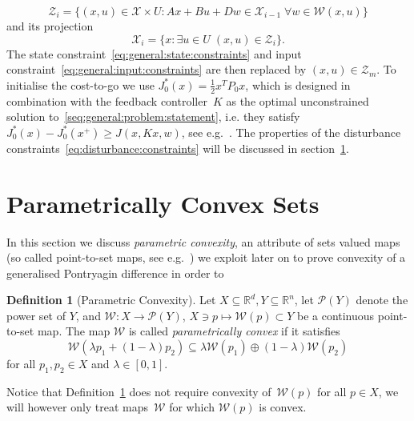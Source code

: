 \documentclass[journal]{IEEEtran}
\newcounter{thmcount}
\theoremstyle{remark}
\theoremstyle{definition}
\newtheorem{defi}[thmcount]{Definition}
\begin{document}
%
\begin{equation}\label{eq:stage:constraints:in:x:and:u}
  \mathcal Z_i = \{(x,u)\in\mathcal X\times U: Ax + Bu + Dw \in\mathcal X_{i-1}\;\forall w\in\mathcal W(x,u)\}
\end{equation}
%
and its projection
%
\begin{equation}
  \mathcal X_i = \{x:\exists u\in U\; (x,u)\in\mathcal Z_i\}.
\end{equation}
%
The state constraint~\eqref{eq:general:state:constraints} and input constraint~\eqref{eq:general:input:constraints}
are then replaced by $(x,u)\in\mathcal Z_m$.
%
To initialise the cost-to-go we use $J_0^\ast(x) = \frac{1}{2}x^T P_0x$, which is designed in combination with the feedback 
controller~$K$ as the optimal unconstrained solution to~\eqref{seq:general:problem:statement}, i.e. they satisfy
$J_0^\ast(x) - J_0^\ast(x^+)\geq J(x,Kx,w)$, see e.g.~\cite{Boyd:94}.
%
The properties of the disturbance constraints~\eqref{eq:disturbance:constraints} will be discussed
in section~\ref{sec:p:convex:sets}.
%
%
%
%
\section{Parametrically Convex Sets}\label{sec:p:convex:sets}
In this section we discuss \emph{parametric convexity}, an attribute of sets valued maps 
(so called point-to-set maps, see e.g.~\cite{Hogan:1973}) we exploit later on to prove 
convexity of a generalised Pontryagin difference in order to 
%
\begin{defi}[Parametric Convexity]\label{def:parametric:convexity}
  Let $X\subseteq\mathbb R^d, Y\subseteq\mathbb R^n$, let $\mathscr P(Y)$ 
  denote the power set of $Y$, 
  and $\mathcal W:X\rightarrow \mathscr P(Y)$, $X\ni p\mapsto \mathcal W(p)
  \subset Y$ be a continuous point-to-set map. The map $\mathcal W$ is called 
  \emph{parametrically convex} if it satisfies
%
  \begin{equation}\label{eq:def:parametrically:convex}
  \mathcal W(\lambda p_1 + (1-\lambda)p_2)\subseteq\lambda \mathcal W(p_1) \oplus (1-\lambda) \mathcal W(p_2)
  \end{equation}
%
  for all $p_1,p_2\in X$ and $\lambda\in[0,1]$.
\end{defi}
%
Notice that Definition~\ref{def:parametric:convexity} does not require convexity of~$\mathcal W(p)$ for all
$p\in X$, we will however only treat maps~$\mathcal W$ for which $\mathcal W(p)$ is convex.
\end{document}
